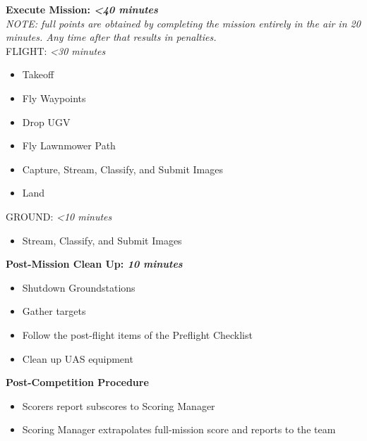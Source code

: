 \documentclass[]{auvsi_doc}
\begin{document}
\textbf{Execute Mission: \textit{\textless40 minutes}}\\
\indent \textit{NOTE: full points are obtained by completing the mission entirely in the air in 20 minutes. Any time after that results in penalties.}\\
FLIGHT: \textit{\textless30 minutes}
\begin{itemize}
	\item Takeoff
	\item Fly Waypoints
	\item Drop UGV
	\item Fly Lawnmower Path
	\item Capture, Stream, Classify, and Submit Images
	\item Land
\end{itemize}

GROUND: \textit{\textless10 minutes}
\begin{itemize}
	\item Stream, Classify, and Submit Images
\end{itemize}

\hrulefill

\textbf{Post-Mission Clean Up: \textit{10 minutes}}
\begin{itemize}
	\item Shutdown Groundstations
	\item Gather targets
	\item Follow the post-flight items of the Preflight Checklist
	\item Clean up UAS equipment
\end{itemize}

\textbf{Post-Competition Procedure}
\begin{itemize}
	\item Scorers report subscores to Scoring Manager
	\item Scoring Manager extrapolates full-mission score and reports to the team
\end{itemize}
\end{document}
